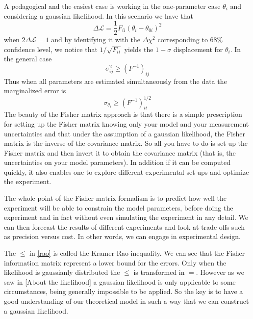 \documentclass[onecolumn,           %
               showpacs,            %
               preprintnumbers,     %
               aps,                 %
               prl,          	    %
               letterpaper,             %
               superscriptaddress,      %
               nofootinbib,         %
               tightenlines,        %
               floats,floatfix      %
               ,usenatbib,
               ]{revtex4-1}
\begin{document}
A pedagogical and the easiest case is working in the one-parameter case $\theta_i$ and considering a gaussian likelihood. In this scenario we have that
\begin{equation}
\Delta \mathcal{L}=\frac{1}{2}F_{ii}(\theta_i- \theta_{0i})^2
\end{equation}
when $2\Delta\mathcal{L}=1$ and by identifying it with the $\Delta \chi^2$ corresponding to $68\%$ confidence level, we notice that $1/\sqrt{F_{ii}}$ yields the $1-\sigma$ displacement for $\theta_i$. In the general case
\begin{equation}\label{rao}
\sigma_{ij}^2 \geq (F^{-1})_{ij}
\end{equation}
Thus when all parameters are estimated simultaneously from the data the marginalized error is
\begin{equation}
\sigma_{\theta_i}\geq (F^{-1})^{1/2}_{ii}
\end{equation}
The beauty of the Fisher matrix approach is that there is a simple prescription for setting up the Fisher matrix knowing only your model and your measurement uncertainties and that
under the assumption of a gaussian likelihood, the Fisher matrix is the inverse of the covariance matrix. So all you have to do is set up the Fisher matrix and then invert it to obtain the covariance matrix (that is, the uncertainties on your model parameters). In addition if it can be computed quickly, it also enables one to explore different experimental set ups and optimize the experiment.

The whole point of the Fisher matrix formalism is to predict how well the experiment will be able to constrain the model parameters, before doing the experiment and in fact without even simulating the experiment in any detail. We can then forecast the results of different experiments and look at trade offs such as precision versus cost. In other words, we can engage in experimental design.

The $\leq$ in \eqref{rao} is called the Kramer-Rao inequality. We can see that the Fisher information matrix represent a lower bound for the errors. Only when the likelihood is gaussianly distributed the $\leq$ is transformed in $=$. However as we saw in [About the likelihood] a gaussian likelihood is only applicable to some circumstances, being generally impossible to be applied. So the key is to  have a good understanding of our theoretical model in such a way that we can construct a gaussian likelihood.
\end{document}

